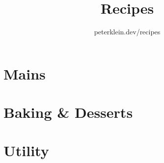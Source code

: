 \documentclass{book}
\title{Recipes}
\author{peterklein.dev/recipes}
\date{}
\begin{document}
\maketitle
\tableofcontents
\thispagestyle{bookdatestyle}

\part{Mains}




\part{Baking \& Desserts}






\part{Utility}

\end{document}
